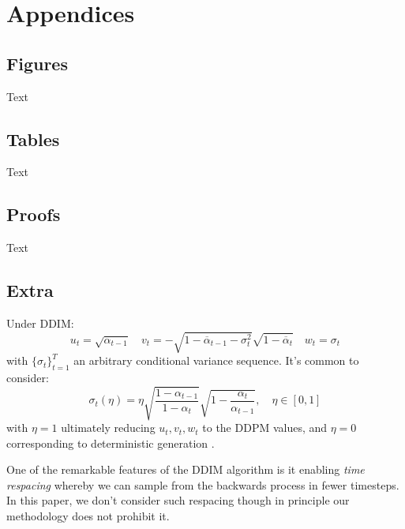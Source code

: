 \chapter*{Appendices}

\section{Figures}\label{sec:figures}

Text

\section{Tables}\label{sec:tables}

Text

\section{Proofs}\label{sec:proofs}

Text

\section{Extra}

\begin{remark}
    Under DDIM:
    \begin{equation*}
        u_t = \sqrt{\alpha_{t-1}} \quad
        v_t = -\sqrt{1 - \overline{\alpha}_{t-1} - \sigma_t^2}\sqrt{1 - \overline{\alpha}_t} \quad
        w_t = \sigma_t
    \end{equation*}
    with $\{\sigma_t\}_{t=1}^T$ an arbitrary conditional variance sequence. It's common to consider:
    \begin{equation*}
        \sigma_t(\eta) = \eta\sqrt{\frac{1 - \alpha_{t-1}}{1 - \alpha_t}}\sqrt{1 - \frac{\alpha_t}{\alpha_{t-1}}},\quad \eta \in [0,1]
    \end{equation*}
    with $\eta=1$ ultimately reducing $u_t, v_t, w_t$ to the DDPM values, and $\eta=0$ corresponding
    to deterministic generation \parencite{songDenoisingDiffusionImplicit2020}.
\end{remark}

\begin{remark}
    One of the remarkable features of the DDIM algorithm is it enabling \emph{time respacing}
    whereby we can sample from the backwards process in fewer timesteps. In this paper, we don't
    consider such respacing though in principle our methodology does not prohibit it.
\end{remark}

